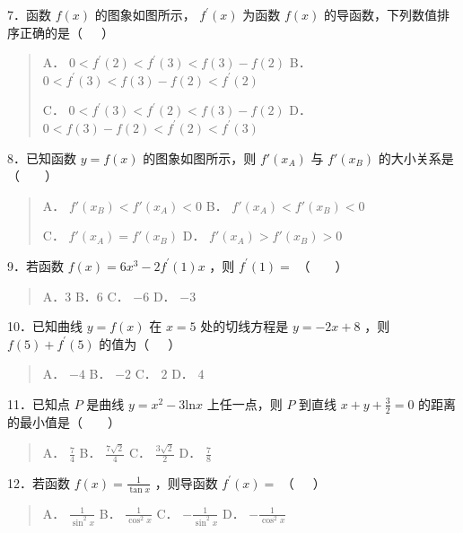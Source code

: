 7．函数 $f(x)$ 的图象如图所示， $f^{\prime}(x)$ 为函数 $f(x)$ 的导函数，下列数值排序正确的是（~~~）

\begin{quote}
    A． $0 < f^{\prime}(2) < f^{\prime}(3) < f(3) - f(2)$
    B． $0 < f^{\prime}(3) < f(3) - f(2) < f^{\prime}(2)$

    C． $0 < f^{\prime}(3) < f^{\prime}(2) < f(3) - f(2)$
    D． $0 < f(3) - f(2) < f^{\prime}(2) < f^{\prime}(3)$
\end{quote}

8．已知函数 $y = f(x)$ 的图象如图所示，则 $f\prime\left( x_{A} \right)$ 与 $f\prime\left( x_{B} \right)$ 的大小关系是（~~~~）

\begin{quote}
    A． $f\prime\left( x_{B} \right) < f\prime\left( x_{A} \right) < 0$
    B． $f\prime\left( x_{A} \right) < f\prime\left( x_{B} \right) < 0$

    C． $f\prime\left( x_{A} \right) = f\prime\left( x_{B} \right)$
    D． $f\prime\left( x_{A} \right) > f\prime\left( x_{B} \right) > 0$
\end{quote}

9．若函数 $f(x) = 6x^{3} - 2f^{\prime}(1)x$ ，则 $f^{\prime}(1) =$ （~~~~）

\begin{quote}
    A．3 B．6 C． $- 6$  D． $- 3$
\end{quote}

10．已知曲线 $y = f(x)$ 在 $x = 5$ 处的切线方程是 $y = - 2x + 8$ ，则 $f(5) + f^{\prime}(5)$ 的值为（~~~）

\begin{quote}
    A． $- 4$  B． $- 2$  C． $2$  D． $4$
\end{quote}

11．已知点 $P$ 是曲线 $y = x^{2} - 3\text{ln}x$ 上任一点，则 $P$ 到直线 $x + y + \frac{3}{2} = 0$ 的距离的最小值是（~~~~）

\begin{quote}
    A． $\frac{7}{4}$  B． $\frac{7\sqrt{2}}{4}$  C． $\frac{3\sqrt{2}}{2}$
    D． $\frac{7}{8}$
\end{quote}

12．若函数 $f(x) = \frac{1}{\tan x}$ ，则导函数 $f^{\prime}(x) =$ （~~~）

\begin{quote}
    A． $\frac{1}{\sin^{2}x}$  B． $\frac{1}{\cos^{2}x}$
    C． $- \frac{1}{\sin^{2}x}$  D． $- \frac{1}{\cos^{2}x}$
\end{quote}


